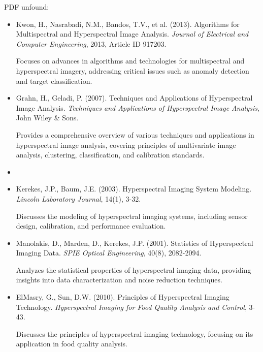 \documentclass[10pt,svgnames,fragile]{beamer}
\begin{document}
\begin{frame}{PDF unfound:}
\tiny
\begin{itemize}
    \item Kwon, H., Nasrabadi, N.M., Bandos, T.V., et al. (2013). Algorithms for Multispectral and Hyperspectral Image Analysis. \textit{Journal of Electrical and Computer Engineering}, 2013, Article ID 917203. \href{https://www.hindawi.com/journals/jece/2013/917203/}{\color{blue}{DOI: 10.1155/2013/917203}}
    
    {\color{gray}Focuses on advances in algorithms and technologies for multispectral and hyperspectral imagery, addressing critical issues such as anomaly detection and target classification.}
    
    \item Grahn, H., Geladi, P. (2007). Techniques and Applications of Hyperspectral Image Analysis. \textit{Techniques and Applications of Hyperspectral Image Analysis}, John Wiley \& Sons. \href{https://books.google.com/books?id=2ifVDwAAQBAJ}{\color{blue}{DOI: 10.1002/9780470010861}} 

    {\color{gray}Provides a comprehensive overview of various techniques and applications in hyperspectral image analysis, covering principles of multivariate image analysis, clustering, classification, and calibration standards.}

    \item

    \item Kerekes, J.P., Baum, J.E. (2003). Hyperspectral Imaging System Modeling. \textit{Lincoln Laboratory Journal}, 14(1), 3-32. \href{https://apps.dtic.mil/sti/citations/ADA415477}{\color{blue}{DOI: 10.1109/TGRS.2003.814658}}
    
    {\color{gray}Discusses the modeling of hyperspectral imaging systems, including sensor design, calibration, and performance evaluation.}

    \item Manolakis, D., Marden, D., Kerekes, J.P. (2001). Statistics of Hyperspectral Imaging Data. \textit{SPIE Optical Engineering}, 40(8), 2082-2094. \href{https://www.spiedigitallibrary.org/journals/optical-engineering/volume-40/issue-8/2082/Statistics-of-hyperspectral-imaging-data/10.1117/1.1394690.full}{\color{blue}{DOI: 10.1117/1.1394690}}
    
    {\color{gray}Analyzes the statistical properties of hyperspectral imaging data, providing insights into data characterization and noise reduction techniques.}
    
    \item ElMasry, G., Sun, D.W. (2010). Principles of Hyperspectral Imaging Technology. \textit{Hyperspectral Imaging for Food Quality Analysis and Control}, 3-43. \href{https://www.elsevier.com/books/hyperspectral-imaging-for-food-quality-analysis-and-control/sun/978-0-12-374753-2}{\color{blue}{DOI: 10.1016/B978-0-12-374753-2.00001-8}}
    
    {\color{gray}Discusses the principles of hyperspectral imaging technology, focusing on its application in food quality analysis.}
\end{itemize}
\end{frame}
\end{document}
